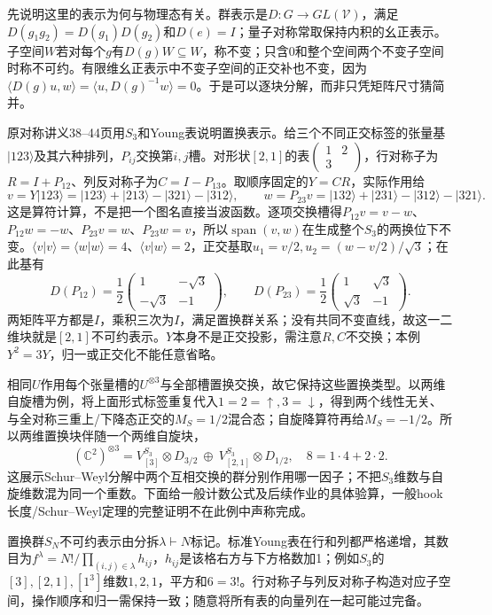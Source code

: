 先说明这里的表示为何与物理态有关。群表示是$D:G\to GL(\mathcal V)$，满足$D(g_1g_2)=D(g_1)D(g_2)$和$D(e)=I$；量子对称常取保持内积的幺正表示。子空间$W$若对每个$g$有$D(g)W\subseteq W$，称不变；只含$0$和整个空间两个不变子空间时称不可约。有限维幺正表示中不变子空间的正交补也不变，因为$\langle D(g)u,w\rangle=\langle u,D(g)^{-1}w\rangle=0$。于是可以逐块分解，而非只凭矩阵尺寸猜简并。

原对称讲义38--44页用$S_3$和Young表说明置换表示。给三个不同正交标签的张量基$|123\rangle$及其六种排列，$P_{ij}$交换第$i,j$槽。对形状$[2,1]$的表$\left(\begin{smallmatrix}1&2\\3&\end{smallmatrix}\right)$，行对称子为$R=I+P_{12}$、列反对称子为$C=I-P_{13}$。取顺序固定的$Y=CR$，实际作用给
\[
 v=Y|123\rangle=|123\rangle+|213\rangle-|321\rangle-|312\rangle,
 \qquad
 w=P_{23}v=|132\rangle+|231\rangle-|312\rangle-|321\rangle.
\]
这是算符计算，不是把一个图名直接当波函数。逐项交换槽得$P_{12}v=v-w$、$P_{12}w=-w$、$P_{23}v=w$、$P_{23}w=v$，所以$\operatorname{span}(v,w)$在生成整个$S_3$的两换位下不变。$\langle v|v\rangle=\langle w|w\rangle=4$、$\langle v|w\rangle=2$，正交基取$u_1=v/2,u_2=(w-v/2)/\sqrt3$；在此基有
\[
 D(P_{12})=\frac12\begin{pmatrix}1&-\sqrt3\\-\sqrt3&-1\end{pmatrix},\qquad
 D(P_{23})=\frac12\begin{pmatrix}1&\sqrt3\\\sqrt3&-1\end{pmatrix}.
\]
两矩阵平方都是$I$，乘积三次为$I$，满足置换群关系；没有共同不变直线，故这一二维块就是$[2,1]$不可约表示。$Y$本身不是正交投影，需注意$R,C$不交换；本例$Y^2=3Y$，归一或正交化不能任意省略。

相同$U$作用每个张量槽的$U^{\otimes3}$与全部槽置换交换，故它保持这些置换类型。以两维自旋槽为例，将上面形式标签重复代入$1=2=\uparrow,3=\downarrow$，得到两个线性无关、与全对称三重上/下降态正交的$M_S=1/2$混合态；自旋降算符再给$M_S=-1/2$。所以两维置换块伴随一个两维自旋块，
\[
 (\mathbb C^2)^{\otimes3}
 =V^{S_3}_{[3]}\otimes D_{3/2}\ \oplus\ V^{S_3}_{[2,1]}\otimes D_{1/2},\quad
 8=1\cdot4+2\cdot2.
\]
这展示Schur--Weyl分解中两个互相交换的群分别作用哪一因子；不把$S_3$维数与自旋维数混为同一个重数。下面给一般计数公式及后续作业的具体验算，一般hook长度/Schur--Weyl定理的完整证明不在此例中声称完成。

置换群$S_N$不可约表示由分拆$\lambda\vdash N$标记。标准Young表在行和列都严格递增，其数目为$f^\lambda=N!/\prod_{(i,j)\in\lambda}h_{ij}$，$h_{ij}$是该格右方与下方格数加1；例如$S_3$的$[3],[2,1],[1^3]$维数$1,2,1$，平方和$6=3!$。行对称子与列反对称子构造对应子空间，操作顺序和归一需保持一致；随意将所有表的向量列在一起可能过完备。

